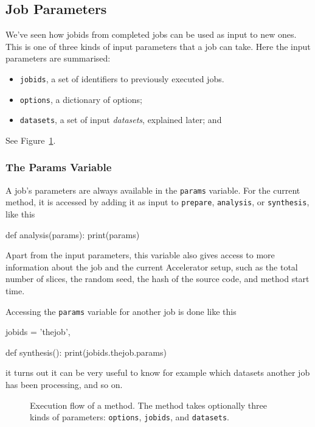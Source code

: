\documentclass[a4paper]{article}
\begin{document}
\subsection{Job Parameters}


We've seen how jobids from completed jobs can be used as input to new
ones.  This is one of three kinds of input parameters that a job can
take.  Here the input parameters are summarised:
\begin{itemize}
  \item[] \texttt{jobids}, a set of identifiers to previously executed jobs.
  \item[] \texttt{options}, a dictionary of options;
  \item[] \texttt{datasets}, a set of input \textsl{datasets}, explained later; and
\end{itemize}
See Figure~\ref{fig:execflow}.



\subsubsection{The Params Variable}
A job's parameters are always available in the \texttt{params}
variable.  For the current method, it is accessed by adding it as
input to \texttt{prepare}, \texttt{analysis}, or \texttt{synthesis}, like this
\begin{python}
  def analysis(params):
    print(params)
\end{python}
Apart from the input parameters, this variable also gives access to
more information about the job and the current Accelerator setup, such
as the total number of slices, the random seed, the hash of the source
code, and method start time.


Accessing the \texttt{params} variable for another job is done like this
\begin{python}
  jobids = {'thejob',}

  def synthesis():
    print(jobids.thejob.params)
\end{python}
it turns out it can be very useful to know for example which datasets
another job has been processing, and so on.

\begin{figure}[h!]
  \begin{center}
    
    \caption{Execution flow of a method.  The method takes optionally
      three kinds of parameters: \texttt{options}, \texttt{jobids},
      and \texttt{datasets}.}
    \label{fig:execflow}
  \end{center}
\end{figure}
\end{document}
